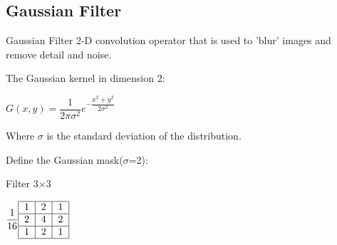 \documentclass{beamer}
\begin{document}
\subsection{Gaussian Filter}
\begin{frame}{Gaussian Filter}
2-D convolution operator that is used to 'blur' images and remove detail and noise.
\vspace{0.8cm}

The Gaussian kernel in dimension 2:




\hspace{3cm}$G(x,y)=\dfrac{1}{2\pi\sigma^2}e^{-{\dfrac{x^2+y^2}{2\sigma^2}}}$\vspace{0.2cm}	

Where $\sigma$ is the standard deviation of the distribution.
\vspace{0.8cm}

Define the Gaussian mask($\sigma$=2):
\begin{center}
	Filter 3$\times$3
	
	$\dfrac{1}{16}\begin{tabular}{|c|c|c|}
	\hline 
	1 & 2 & 1 \\ 
	\hline 
	2 & 4 & 2 \\ 
	\hline 
	1 & 2 & 1 \\ 
	\hline 
	\end{tabular} $
\end{center}
\end{frame}
\end{document}
